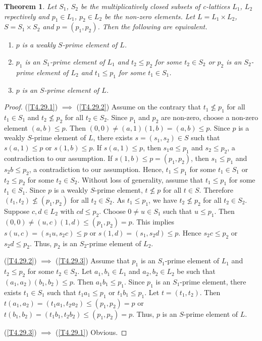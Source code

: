 \documentclass[10pt,twoside,a4paper]{amsart}
\numberwithin{equation}{section}
\theoremstyle{plain}
\newtheorem{thm}[lem]{Theorem}
\theoremstyle{definition}
\begin{document}
\begin{thm}%
	Let $S_1$, $S_2$ be the multiplicatively closed subsets of c-lattices $L_1$, $L_2$ repectively and $p_1\in L_1$, $p_2\in L_2$ be the non-zero elements. Let $L=L_1\times L_2$, $S=S_1\times S_2$ and $p=(p_1,p_2)$. Then the following are equivalent.
	\begin{enumerate}
		\item\label{T4.29.1} $p$ is a weakly $S$-prime element of $L$.
		\item\label{T4.29.2} $p_1$ is an $S_1$-prime element of $L_1$ and $t_2\leq p_2$ for some $t_2\in S_2$ or $p_2$ is an $S_2$-prime element of $L_2$ and $t_1\leq p_1$ for some $t_1\in S_1$.
		\item\label{T4.29.3} $p$ is an $S$-prime element of $L$.
	\end{enumerate}
\end{thm}
\begin{proof}
	(\ref{T4.29.1}) $\implies$ (\ref{T4.29.2}) Assume on the contrary that $t_1\nleq p_1$ for all $t_1\in S_1$ and $t_2\nleq p_2$ for all $t_2\in S_2$. Since $p_1$ and $p_2$ are non-zero, choose a non-zero element $(a,b)\leq p$. Then $(0,0)\neq (a,1)(1,b)=(a,b)\leq p$. Since $p$ is a weakly $S$-prime element of $L$, there exists $s=(s_1,s_2)\in S$ such that $s(a,1)\leq p$ or $s(1,b)\leq p$. If $s(a,1)\leq p$, then $s_1a\leq p_1$ and $s_2\leq p_2$, a contradiction to our assumption. If $s(1,b)\leq p=(p_1,p_2)$, then $s_1\leq p_1$ and $s_2b\leq p_2$, a contradiction to our assumption. Hence, $t_1\leq p_1$ for some $t_1\in S_1$ or $t_2\leq p_2$ for some $t_2\in S_2$. Without loss of generality, assume that $t_1\leq p_1$ for some $t_1\in S_1$. Since $p$ is a weakly $S$-prime element, $t\nleq p$ for all $t\in S$. Therefore $(t_1,t_2)\nleq (p_1,p_2)$ for all $t_2\in S_2$. As $t_1\leq p_1$, we have $t_2\nleq p_2$ for all $t_2\in S_2$. Suppose $c,d\in L_2$ with $cd\leq p_2$. Choose $0\neq u\in S_1$ such that $u\leq p_1$. Then $(0,0)\neq (u,c)(1,d)\leq (p_1,p_2)=p$. This implies $s(u,c)=(s_1u,s_2c)\leq p$ or $s(1,d)=(s_1,s_2d)\leq p$. Hence $s_2c\leq p_2$ or $s_2d\leq p_2$. Thus, $p_2$ is an $S_2$-prime element of $L_2$.
	
	(\ref{T4.29.2}) $\implies$ (\ref{T4.29.3}) Assume that $p_1$ is an $S_1$-prime element of $L_1$ and $t_2\leq p_2$ for some $t_2\in S_2$. Let $a_1,b_1\in L_1$ and $a_2,b_2\in L_2$ be such that $(a_1,a_2)(b_1,b_2)\leq p$. Then $a_1b_1\leq p_1$. Since $p_1$ is an  $S_1$-prime element, there exists $t_1\in S_1$ such that $t_1a_1\leq p_1$ or $t_1b_1\leq p_1$. Let $t=(t_1,t_2)$. Then $t(a_1,a_2)=(t_1a_1,t_2a_2)\leq (p_1,p_2)=p$ or $t(b_1,b_2)=(t_1b_1,t_2b_2)\leq (p_1,p_2)=p$. Thus, $p$ is an $S$-prime element of $L$.
	
	(\ref{T4.29.3}) $\implies$ (\ref{T4.29.1}) Obvious.
\end{proof}
\end{document}
